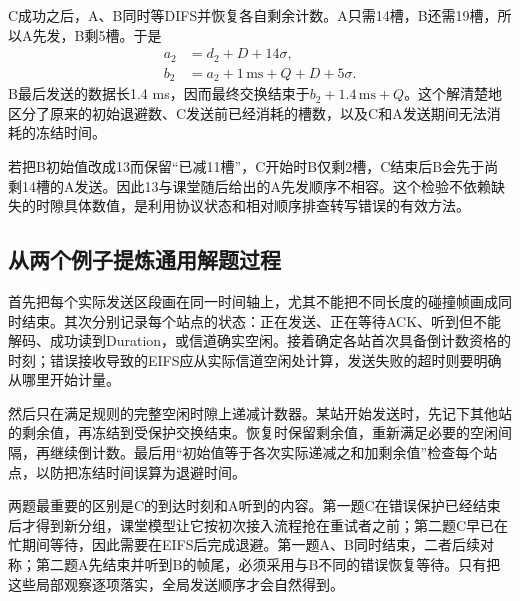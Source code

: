 C成功之后，A、B同时等DIFS并恢复各自剩余计数。A只需14槽，B还需19槽，所以A先发，B剩5槽。于是
\begin{align}
a_2&=d_2+D+14\sigma,\\
b_2&=a_2+1\,\mathrm{ms}+Q+D+5\sigma.
\end{align}
B最后发送的数据长1.4 ms，因而最终交换结束于$b_2+1.4\,\mathrm{ms}+Q$。这个解清楚地区分了原来的初始退避数、C发送前已经消耗的槽数，以及C和A发送期间无法消耗的冻结时间。

若把B初始值改成13而保留“已减11槽”，C开始时B仅剩2槽，C结束后B会先于尚剩14槽的A发送。因此13与课堂随后给出的A先发顺序不相容。这个检验不依赖缺失的时隙具体数值，是利用协议状态和相对顺序排查转写错误的有效方法。

\subsection{从两个例子提炼通用解题过程}

首先把每个实际发送区段画在同一时间轴上，尤其不能把不同长度的碰撞帧画成同时结束。其次分别记录每个站点的状态：正在发送、正在等待ACK、听到但不能解码、成功读到Duration，或信道确实空闲。接着确定各站首次具备倒计数资格的时刻；错误接收导致的EIFS应从实际信道空闲处计算，发送失败的超时则要明确从哪里开始计量。

然后只在满足规则的完整空闲时隙上递减计数器。某站开始发送时，先记下其他站的剩余值，再冻结到受保护交换结束。恢复时保留剩余值，重新满足必要的空闲间隔，再继续倒计数。最后用“初始值等于各次实际递减之和加剩余值”检查每个站点，以防把冻结时间误算为退避时间。

两题最重要的区别是C的到达时刻和A听到的内容。第一题C在错误保护已经结束后才得到新分组，课堂模型让它按初次接入流程抢在重试者之前；第二题C早已在忙期间等待，因此需要在EIFS后完成退避。第一题A、B同时结束，二者后续对称；第二题A先结束并听到B的帧尾，必须采用与B不同的错误恢复等待。只有把这些局部观察逐项落实，全局发送顺序才会自然得到。
